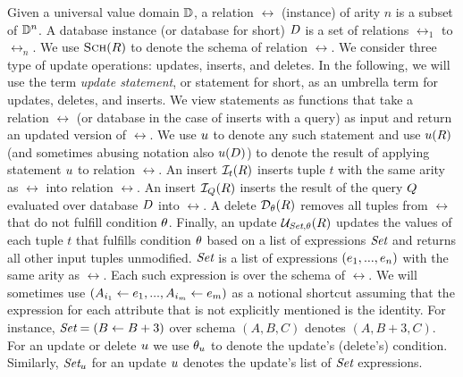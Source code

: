 Given a universal value domain $\mathbb{D}$, a relation $\rel$ (instance) of %
arity $n$ is a subset of $\mathbb{D}^{n}$. A database instance (or database for short) $D$ %
is a set of relations $\rel_1$ to $\rel_n$. We use $\textsc{Sch}(R)$ to denote the schema of relation $\rel$. %
%
We consider three type of update operations: updates, inserts, and deletes. In the following, we will use the term \textit{update statement}, or statement for short, as an umbrella term for updates, deletes, and inserts. We view statements as functions that take a relation $\rel$ (or database in the case of inserts with a query) as input and return an updated version of $\rel$. We use $u$ to denote any such statement and use $u(R)$ (and sometimes abusing notation also $u(D)$) to denote the result of applying statement $u$ to relation $\rel$. An insert $\mathcal{I}_{t}(R)$ inserts tuple $t$ with the same arity as $\rel$ into relation $\rel$. An insert $\mathcal{I}_{Q}(R)$ inserts the result of the query $Q$ evaluated over database $D$ into $\rel$. A delete $\mathcal{D}_{\theta}(R)$ removes all tuples from $\rel$ that do not fulfill condition $\theta$. Finally, an update $\mathcal{U}_{\textit{Set},\theta}(R)$ updates the values of each tuple $t$ that fulfills condition $\theta$ based on a list of expressions $\textit{Set}$ and returns all other input tuples unmodified. $\textit{Set}$ is a list of expressions $(e_1,...,e_n)$ with the same arity as $\rel$. Each such expression is over the schema of $\rel$. We will sometimes use $(A_{i_1}\leftarrow e_1,...,A_{i_m}\leftarrow e_m)$ as a notional shortcut assuming that the expression for each attribute that is not explicitly mentioned is the identity. For instance, $\textit{Set} = (B \leftarrow B + 3)$ over schema $(A,B,C)$ denotes $(A, B + 3, C)$. For an update or delete $u$ we use $\theta_{u}$ to denote the update's (delete's) condition. Similarly, $\textit{Set}_{u}$ for an update $u$ denotes the update's list of $\textit{Set}$ expressions.



